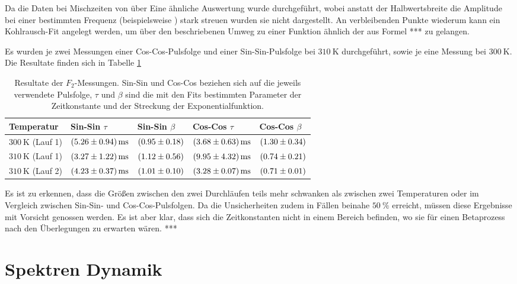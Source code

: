 Da die Daten bei Mischzeiten von über Eine ähnliche Auswertung wurde durchgeführt, wobei anstatt der Halbwertsbreite die Amplitude bei einer bestimmten Frequenz (beispielsweise )
 stark streuen wurden sie nicht dargestellt. An verbleibenden Punkte wiederum kann ein Kohlrausch-Fit angelegt werden, um über den beschriebenen Umweg zu einer Funktion ähnlich der aus Formel *** zu gelangen.

Es wurden je zwei Messungen einer Cos-Cos-Pulsfolge und einer Sin-Sin-Pulsfolge bei $\SI{310}{\kelvin}$ durchgeführt, sowie je eine Messung bei $\SI{300}{\kelvin}$. Die Resultate finden sich in Tabelle \ref{tab:res:F_2}

\begin{table}[H]
	\centering
	\begin{tabular}{lllll}
		\hline
		Temperatur & Sin-Sin $\tau$ & Sin-Sin $\beta$ & Cos-Cos $\tau$ & Cos-Cos $\beta$ \\ \hline
		$\SI{300}{\kelvin}$ (Lauf 1) & $\SI{5.26 (94)}{\milli s}$ & $\SI{0.95 (18)}{}$ & $\SI{3.68 (63)}{\milli s}$ & $\SI{1.30 (34)}{}$ \\
		$\SI{310}{\kelvin}$ (Lauf 1) & $\SI{3.27 (122)}{\milli s}$ & $\SI{1.12 (56)}{}$ & $\SI{9.95 (432)}{\milli s}$ & $\SI{0.74 (21)}{}$ \\
		$\SI{310}{\kelvin}$ (Lauf 2) & $\SI{4.23 (37)}{\milli s}$ & $\SI{1.01 (10)}{}$ & $\SI{3.28 (7)}{\milli s}$ & $\SI{0.71 (1)}{}$ \\
		 \hline
	\end{tabular}
	\caption{Resultate der $F_2$-Messungen. Sin-Sin und Cos-Cos beziehen sich auf die jeweils verwendete Pulsfolge, $\tau$ und $\beta$ sind die mit den Fits bestimmten Parameter der Zeitkonstante und der Streckung der Exponentialfunktion. \label{tab:res:F_2}}
\end{table}

Es ist zu erkennen, dass die Größen zwischen den zwei Durchläufen teils mehr schwanken als zwischen zwei Temperaturen oder im Vergleich zwischen Sin-Sin- und Cos-Cos-Pulsfolgen. Da die Unsicherheiten zudem in Fällen beinahe $\SI{50}{\percent}$ erreicht, müssen diese Ergebnisse mit Vorsicht genossen werden. Es ist aber klar, dass sich die Zeitkonstanten nicht in einem Bereich befinden, wo sie für einen Betaprozess nach den Überlegungen zu erwarten wären. ***



\section{Spektren Dynamik} \label{section:res:spekdyn}

